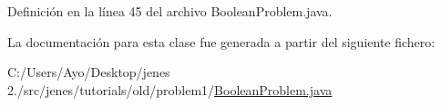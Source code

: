 Definición en la línea 45 del archivo Boolean\-Problem.\-java.



La documentación para esta clase fue generada a partir del siguiente fichero\-:\begin{DoxyCompactItemize}
\item 
C\-:/\-Users/\-Ayo/\-Desktop/jenes 2./src/jenes/tutorials/old/problem1/\hyperlink{old_2problem1_2_boolean_problem_8java}{Boolean\-Problem.\-java}\end{DoxyCompactItemize}
